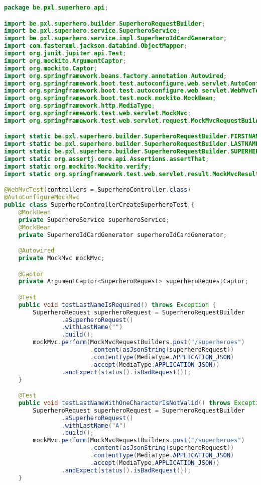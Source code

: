 \begin{lstlisting}[language=java, frame=single]
package be.pxl.superhero.api;

import be.pxl.superhero.builder.SuperheroRequestBuilder;
import be.pxl.superhero.service.SuperheroService;
import be.pxl.superhero.service.impl.SuperheroIdCardGenerator;
import com.fasterxml.jackson.databind.ObjectMapper;
import org.junit.jupiter.api.Test;
import org.mockito.ArgumentCaptor;
import org.mockito.Captor;
import org.springframework.beans.factory.annotation.Autowired;
import org.springframework.boot.test.autoconfigure.web.servlet.AutoConfigureMockMvc;
import org.springframework.boot.test.autoconfigure.web.servlet.WebMvcTest;
import org.springframework.boot.test.mock.mockito.MockBean;
import org.springframework.http.MediaType;
import org.springframework.test.web.servlet.MockMvc;
import org.springframework.test.web.servlet.request.MockMvcRequestBuilders;

import static be.pxl.superhero.builder.SuperheroRequestBuilder.FIRSTNAME;
import static be.pxl.superhero.builder.SuperheroRequestBuilder.LASTNAME;
import static be.pxl.superhero.builder.SuperheroRequestBuilder.SUPERHERO_NAME;
import static org.assertj.core.api.Assertions.assertThat;
import static org.mockito.Mockito.verify;
import static org.springframework.test.web.servlet.result.MockMvcResultMatchers.status;

@WebMvcTest(controllers = SuperheroController.class)
@AutoConfigureMockMvc
public class SuperheroControllerCreateSuperheroTest {
	@MockBean
	private SuperheroService superheroService;
	@MockBean
	private SuperheroIdCardGenerator superheroIdCardGenerator;

	@Autowired
	private MockMvc mockMvc;

	@Captor
	private ArgumentCaptor<SuperheroRequest> superheroRequestCaptor;

	@Test
	public void testLastNameIsRequired() throws Exception {
		SuperheroRequest superheroRequest = SuperheroRequestBuilder
				.aSuperheroRequest()
				.withLastName("")
				.build();
		mockMvc.perform(MockMvcRequestBuilders.post("/superheroes")
						.content(asJsonString(superheroRequest))
						.contentType(MediaType.APPLICATION_JSON)
						.accept(MediaType.APPLICATION_JSON))
				.andExpect(status().isBadRequest());
	}

	@Test
	public void testLastNameWithOneCharacterIsNotValid() throws Exception {
		SuperheroRequest superheroRequest = SuperheroRequestBuilder
				.aSuperheroRequest()
				.withLastName("A")
				.build();
		mockMvc.perform(MockMvcRequestBuilders.post("/superheroes")
						.content(asJsonString(superheroRequest))
						.contentType(MediaType.APPLICATION_JSON)
						.accept(MediaType.APPLICATION_JSON))
				.andExpect(status().isBadRequest());
	}



\end{lstlisting}
